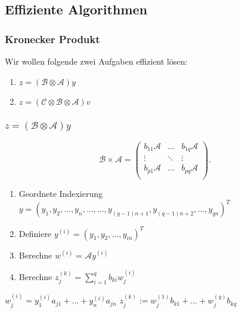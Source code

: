 \subsection{Effiziente Algorithmen}
\begin{frame}
\frametitle{Kronecker Produkt}

Wir wollen folgende zwei Aufgaben effizient lösen:
\begin{enumerate}
\item $ z = (\mathcal{B} \otimes \mathcal{A}) y$
\item $ z = (\mathcal{C} \otimes \mathcal{B} \otimes \mathcal{A}) v $
\end{enumerate}

\end{frame}

\begin{frame}
\frametitle{ $ z = (\mathcal{B} \otimes \mathcal{A}) y$ }
\begin{equation*}
\mathcal{B} \times \mathcal{A} =
\begin{pmatrix}
b_{11}\mathcal{A} & \dots  & b_{1q}\mathcal{A} \\
\vdots & \ddots & \vdots \\
b_{p1}\mathcal{A} & \dots & b_{pq}\mathcal{A} \\
\end{pmatrix}.
\end{equation*}

\begin{enumerate}
\item Geordnete Indexierung $y = (y_1,y_2,\dots,y_n,\dots,\dots,y_{(q-1)n+1},y_{(q-1)n+2},\dots,y_{qn})^T$ 
\item Definiere $y^{(i)}=(y_1,y_2,\dots,y_{in})^T$
\item Berechne $w^{(i)} = \mathcal{A}y^{(i)}$
\item Berechne $ z^{(k)}_j = \sum_{i=1}^{q} b_{ki} w_j^{(i)}$
\end{enumerate}

\end{frame}


\begin{frame}
\begin{mdframed}[backgroundcolor=blue!3] 
\begin{algorithmic}
			\State $w^{(i)}_{j} = y^{(i)}_1 a_{j1} + \dots + y^{(i)}_n a_{jn}$
	\EndFor
\EndFor
{}
			\State $z^{(k)}_j := w^{(1)}_j b_{k1} + \dots + w^{(q)}_j b_{kq}$
	\EndFor
\EndFor

\end{algorithmic}
\end{mdframed}




\end{frame}


